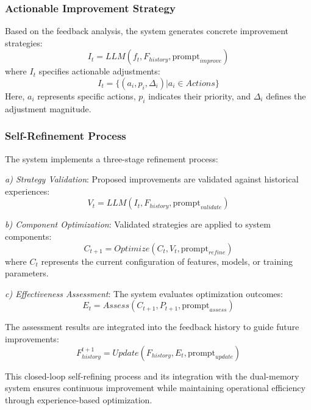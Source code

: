 \documentclass[conference]{IEEEtran}
\begin{document}
\subsubsection{Actionable Improvement Strategy}
Based on the feedback analysis, the system generates concrete improvement strategies:
\begin{equation}
    I_t = LLM(f_t, F_{history}, \text{prompt}_{improve})
\end{equation}
where $I_t$ specifies actionable adjustments:
\begin{equation}
    I_t = \{(a_i, p_i, \Delta_i) | a_i \in Actions\}
\end{equation}
Here, $a_i$ represents specific actions, $p_i$ indicates their priority, and $\Delta_i$ defines the adjustment magnitude.

\subsubsection{Self-Refinement Process}
The system implements a three-stage refinement process:

\textit{a) Strategy Validation}: Proposed improvements are validated against historical experiences:
\begin{equation}
    V_t = LLM(I_t, F_{history}, \text{prompt}_{validate})
\end{equation}

\textit{b) Component Optimization}: Validated strategies are applied to system components:
\begin{equation}
    C_{t+1} = Optimize(C_t, V_t, \text{prompt}_{refine})
\end{equation}
where $C_t$ represents the current configuration of features, models, or training parameters.

\textit{c) Effectiveness Assessment}: The system evaluates optimization outcomes:
\begin{equation}
    E_t = Assess(C_{t+1}, P_{t+1}, \text{prompt}_{assess})
\end{equation}

The assessment results are integrated into the feedback history to guide future improvements:
\begin{equation}
    F_{history}^{t+1} = Update(F_{history}, E_t, \text{prompt}_{update})
\end{equation}

This closed-loop self-refining process and its integration with the dual-memory system ensures continuous improvement while maintaining operational efficiency through experience-based optimization.
\end{document}
